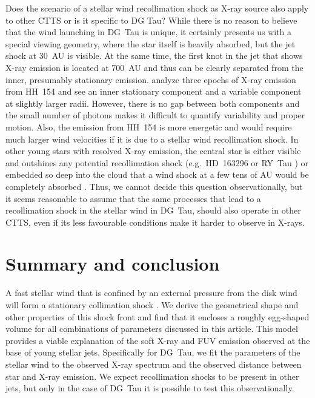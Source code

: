 \documentclass{emulateapj}
\begin{document}
Does the scenario of a stellar wind recollimation shock as X-ray source also apply to other CTTS or is it specific to DG Tau? While there is no reason to believe that the wind launching in DG~Tau is unique, it certainly presents us with a special viewing geometry, where the star itself is heavily absorbed, but the jet shock at 30~AU is visible. At the same time, the first knot in the jet that shows X-ray emission is located at 700~AU and thus can be clearly separated from the inner, presumably stationary emission. \citet{2011A&A...530A.123S} analyze three epochs of X-ray emission from HH~154 and see an inner stationary component and a variable component at slightly larger radii. However, there is no gap between both components and the small number of photons makes it difficult to quantify variability and proper motion. Also, the emission from HH~154 is more energetic and would require much larger wind velocities if it is due to a stellar wind recollimation shock. In other young stars with resolved X-ray emission, the central star is either visible and outshines any potential recollimation shock (e.g.\ HD~163296 \citep{2005ApJ...628..811S,2013A&A...552A.142G} or RY~Tau \citep{2014ApJ...788..101S}) or embedded so deep into the cloud that a wind shock at a few tens of AU would be completely absorbed \citep[e.g.\ HH80/81][]{2004ApJ...605..259P}. Thus, we cannot decide this question observationally, but it seems reasonable to assume that the same processes that lead to a recollimation shock in the stellar wind in DG~Tau, should also operate in other CTTS, even if its less favourable conditions make it harder to observe in X-rays.



\section{Summary and conclusion}
\label{sect:summary}
A fast stellar wind that is confined by an external pressure from the disk wind will form a stationary collimation shock \citep{2012MNRAS.422.2282K}. We derive the geometrical shape and other properties of this shock front and find that it encloses a roughly egg-shaped volume for all combinations of parameters discussed in this article. This model provides a viable explanation of the soft X-ray and FUV emission observed at the base of young stellar jets. Specifically for DG~Tau, we fit the parameters of the stellar wind to the observed X-ray spectrum and the observed distance between star and X-ray emission.  We expect recollimation shocks to be present in other jets, but only in the case of DG~Tau it is possible to test this observationally.
\end{document}
